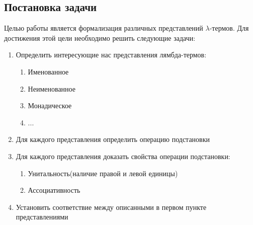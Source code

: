 \subsection{Постановка задачи}

Целью работы является формализация различных представлений $\lambda$-термов. Для достижения этой цели необходимо решить следующие задачи:

\begin{enumerate}
  \item Определить интересующие нас представления лямбда-термов:
    \begin{enumerate}
      \item Именованное
      \item Неименованное
      \item Монадическое
      \item ...
    \end{enumerate}
  \item Для каждого представления определить операцию подстановки
  \item Для каждого представления доказать свойства операции подстановки:
    \begin{enumerate}
      \item Унитальность(наличие правой и левой единицы)
      \item Ассоциативность
    \end{enumerate}
  \item Установить соответствие между описанными в первом пункте представлениями
\end{enumerate}
